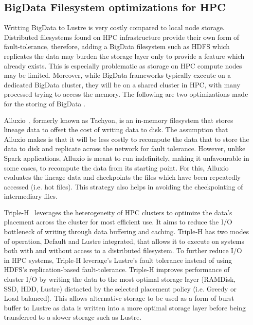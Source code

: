 \documentclass{report}
\begin{document}
            \subsection{BigData Filesystem optimizations for HPC}

                Writting BigData to Lustre is very costly compared to local 
                node storage. Distributed filesystems found on HPC 
                infrastructure provide their own form of fault-tolerance, 
                therefore, adding a BigData filesystem such as HDFS which 
                replicates the data may burden the storage layer only to 
                provide a feature which already exists. This is especially 
                problematic as storage on HPC compute nodes may be limited.
                Moreover, while BigData frameworks typically execute on a 
                dedicated BigData cluster, they will be on a shared cluster in
                HPC, with many processed trying to access the memory. The 
                following are two optimizations made for the storing of BigData
                .

                Alluxio~\cite{Li:2014:TRM:2670979.2670985}, 
                formerly known as Tachyon, is an in-memory filesystem
                that stores lineage data to offset the cost of writing data to 
                disk. The assumption that Alluxio makes is that it will be less
                costly to recompute the data that to store the data to disk and
                replicate across the network for fault tolerance. However,
                unlike Spark applications, Alluxio is meant to run indefinitely,
                making it unfavourable in some cases, to recompute the data
                from its starting point. For this, Alluxio evaluates the 
                lineage data and checkpoints the files which have been 
                repeatedly accessed (i.e. hot files). This strategy also helps 
                in avoiding the checkpointing of intermediary files. 

                Triple-H~\cite{7152476} leverages the heterogeneity of HPC 
                clusters to 
                optimize the data's placement across the cluster for most 
                efficient use. It aims to reduce the I/O bottleneck of writing 
                through data buffering and caching. Triple-H has two modes of
                operation, Default and Lustre integrated,
                that allows it to execute on systems both with and without 
                access to a distributed filesystem. To further reduce I/O in
                HPC systems, Triple-H leverage's Lustre's fault tolerance 
                instead of using HDFS's replication-based fault-tolerance. 
                Triple-H improves 
                performance of cluster I/O by writing the data to
                the most optimal storage layer (RAMDisk, SSD, HDD, Lustre) 
                dictacted by the selected placement policy (i.e. Greedy or 
                Load-balanced). This allows alternative storage to be used as 
                a form of burst buffer to Lustre as data is written into a more
                optimal storage layer before being transferred to a slower 
                storage such as Lustre. 
\end{document}
